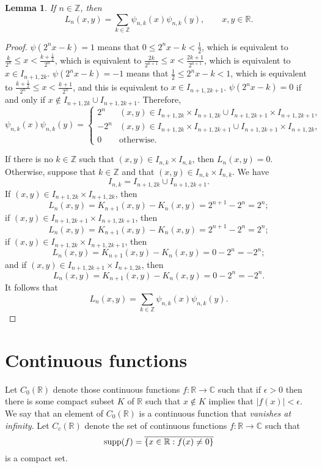 \documentclass{article}
\newcommand{\supp}{\ensuremath\mathrm{supp}}
\newtheorem{lemma}[theorem]{Lemma}
\theoremstyle{definition}
\begin{document}
\begin{lemma}
If $n \in \mathbb{Z}$, then
\[
L_n(x,y) = \sum_{k \in \mathbb{Z}} \psi_{n,k}(x) \psi_{n,k}(y), \qquad x, y \in \mathbb{R}.
\]
\label{Lnformula}
\end{lemma}
\begin{proof}
$\psi(2^nx-k)=1$ means that $0\leq 2^nx-k< \frac{1}{2}$, which is equivalent to 
$\frac{k}{2^n} \leq  x < \frac{k+\frac{1}{2}}{2^n}$, which is equivalent to $\frac{2k}{2^{n+1}} \leq x < \frac{2k+1}{2^{n+1}}$,
which is equivalent to $x \in I_{n+1,2k}$.
$\psi(2^nx-k)=-1$ means that $\frac{1}{2} \leq 2^nx-k < 1$, which
is equivalent to $\frac{k+\frac{1}{2}}{2^n} \leq x < \frac{k+1}{2^n}$, and this is equivalent to $x \in I_{n+1,2k+1}$.
$\psi(2^nx-k)=0$ if and only if $x \not \in  I_{n+1,2k} \cup I_{n+1,2k+1}$.
Therefore, 
\[
\psi_{n,k}(x)\psi_{n,k}(y)=
\begin{cases}
2^n&(x,y) \in I_{n+1,2k} \times I_{n+1,2k} \cup I_{n+1,2k+1} \times I_{n+1,2k+1},\\
-2^n&(x,y) \in I_{n+1,2k} \times  I_{n+1,2k+1} \cup  I_{n+1,2k+1} \times  I_{n+1,2k},\\
0&\mathrm{otherwise.}
\end{cases}
\]


If there is no $k \in \mathbb{Z}$ such that $(x,y) \in I_{n,k} \times I_{n,k}$, then $L_n(x,y)=0$. Otherwise, suppose that $k \in \mathbb{Z}$ and that
$(x,y) \in I_{n,k} \times I_{n,k}$. We have
\[
I_{n,k} = I_{n+1,2k} \cup I_{n+1,2k+1}.
\]
If $(x,y) \in I_{n+1,2k} \times I_{n+1,2k}$, then
\[
L_n(x,y)=K_{n+1}(x,y)-K_n(x,y)=2^{n+1}-2^n=2^n;
\]
if $(x,y) \in I_{n+1,2k+1} \times I_{n+1,2k+1}$, then
\[
L_n(x,y)=K_{n+1}(x,y)-K_n(x,y)=2^{n+1}-2^n=2^n;
\]
if $(x,y) \in I_{n+1,2k} \times I_{n+1,2k+1}$, then
\[
L_n(x,y)=K_{n+1}(x,y)-K_n(x,y)=0-2^n=-2^n;
\]
and if $(x,y) \in  I_{n+1,2k+1}  \times I_{n+1,2k}$, then
\[
L_n(x,y)=K_{n+1}(x,y)-K_n(x,y)=0-2^n=-2^n.
\]
It follows that 
\[
L_n(x,y)=\sum_{k \in \mathbb{Z}} \psi_{n,k}(x)\psi_{n,k}(y).
\]
\end{proof}




\section{Continuous functions}
Let $C_0(\mathbb{R})$ denote those continuous functions $f:\mathbb{R} \to \mathbb{C}$ such that if $\epsilon>0$ then there is some compact
subset $K$ of $\mathbb{R}$ such that $x \not \in K$ implies that $|f(x)|<\epsilon$.
We say that an element of $C_0(\mathbb{R})$ is a continuous function that {\em vanishes at infinity}.
Let $C_c(\mathbb{R})$ denote the set of continuous functions
$f:\mathbb{R} \to \mathbb{C}$ such that
\[
\supp(f) = \overline{\{x \in \mathbb{R}:f(x) \neq 0\}}
\]
is a compact set.
\end{document}
